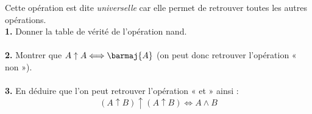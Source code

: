 \documentclass[a4paper,12pt]{article}
\begin{document}
Cette opération est dite \textit{universelle} car elle permet de retrouver toutes les autres opérations.\\

\textbf{1.} 	Donner la table de vérité de l'opération nand.\\

\\
	
\textbf{2.}    Montrer que $A\uparrow A \Longleftrightarrow \barmaj{A}$ (on peut donc retrouver l'opération « non »).\\

\\


\textbf{3.}	En déduire que l'on peut retrouver l'opération « et » ainsi : $$(A\uparrow B)\uparrow(A\uparrow B) \Longleftrightarrow A\wedge B$$ \\

\\
\end{document}
